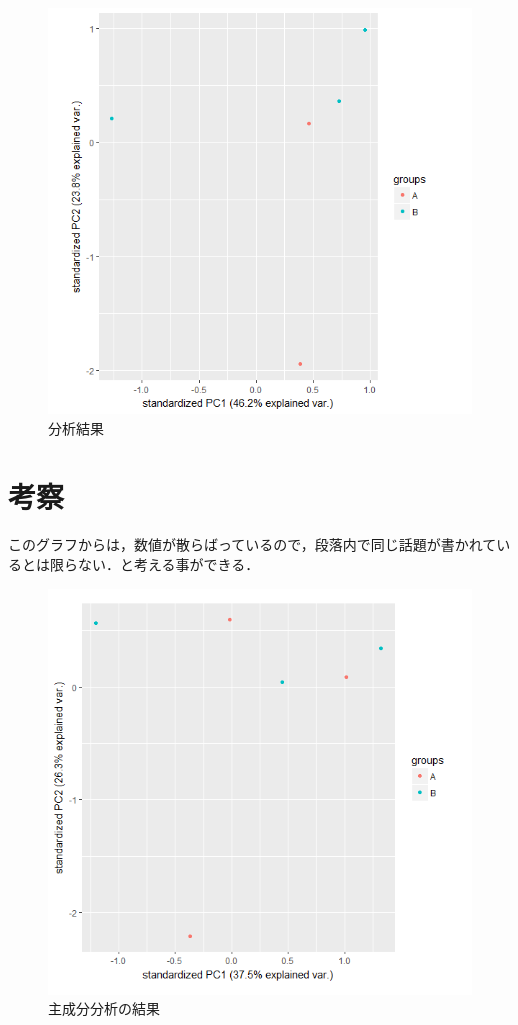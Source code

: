 \begin{figure}[htb]
\centering
\includegraphics[width=13cm]{5-3.png}
\caption{分析結果}\label{5-3}
\end{figure}
\newpage

\chapter{考察}

このグラフからは，数値が散らばっているので，段落内で同じ話題が書かれているとは限らない．と考える事ができる．
\begin{figure}[htb]
\centering
\includegraphics[width=13cm]{4-38.png}
\caption{主成分分析の結果}\label{4-38}
\end{figure}
\newpage

